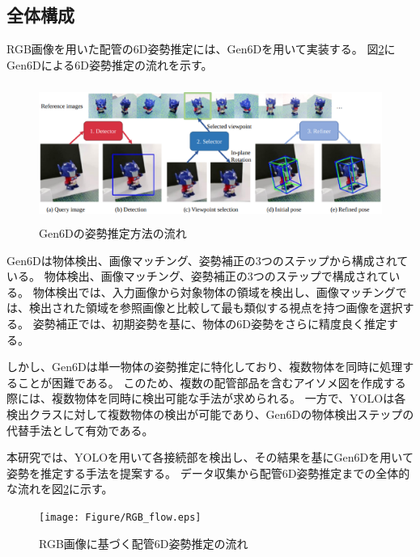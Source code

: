 \subsection{全体構成}
RGB画像を用いた配管の6D姿勢推定には、Gen6Dを用いて実装する。
図\ref{fig:f2}にGen6Dによる6D姿勢推定の流れを示す。
\begin{figure}[htbt]
	\centering
	 \includegraphics[height=45mm]{Figure/Gen6D.eps}
	 \caption{Gen6Dの姿勢推定方法の流れ}
	 \label{fig:f2}
\end{figure}

Gen6Dは物体検出、画像マッチング、姿勢補正の3つのステップから構成されている。
物体検出、画像マッチング、姿勢補正の3つのステップで構成されている。
物体検出では、入力画像から対象物体の領域を検出し、画像マッチングでは、検出された領域を参照画像と比較して最も類似する視点を持つ画像を選択する。
姿勢補正では、初期姿勢を基に、物体の6D姿勢をさらに精度良く推定する。

しかし、Gen6Dは単一物体の姿勢推定に特化しており、複数物体を同時に処理することが困難である。
このため、複数の配管部品を含むアイソメ図を作成する際には、複数物体を同時に検出可能な手法が求められる。
一方で、YOLOは各検出クラスに対して複数物体の検出が可能であり、Gen6Dの物体検出ステップの代替手法として有効である。

本研究では、YOLOを用いて各接続部を検出し、その結果を基にGen6Dを用いて姿勢を推定する手法を提案する。
データ収集から配管6D姿勢推定までの全体的な流れを図\ref{fig:f2}に示す。
\begin{figure}[htbt]
	\centering
	 \texttt{[image: Figure/RGB\_flow.eps]}
	 \caption{RGB画像に基づく配管6D姿勢推定の流れ}
	 \label{fig:f2}
\end{figure}


